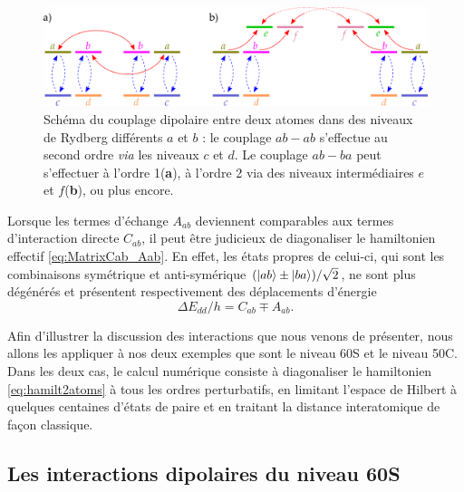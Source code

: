 \begin{figure}[!h]
\centering
\includegraphics[width=0.9\linewidth]{figures/theory/dipole_coupling_abab}
\caption[Couplage dipolaire entre niveaux de Rydberg différents]{Schéma du couplage dipolaire entre deux atomes dans des niveaux de Rydberg différents $a$ et $b$ : le couplage $ab-ab$ s'effectue au second ordre \textit{via} les niveaux $c$ et $d$. Le couplage $ab-ba$ peut s'effectuer à l'ordre 1(\textbf{a}), à l'ordre 2 via des niveaux intermédiaires $e$ et $f$(\textbf{b}), ou plus encore.}
\label{fig:Dip_abab}
\end{figure}


Lorsque les termes d'échange $A_{ab}$ deviennent comparables aux termes d'interaction directe $C_{ab}$, il peut être judicieux de diagonaliser le hamiltonien effectif \eqref{eq:MatrixCab_Aab}.
En effet, les états propres de celui-ci, qui sont les combinaisons symétrique et anti-symérique $(\ket{ab}\pm \ket{ba})/\sqrt{2}$, ne sont plus dégénérés et présentent respectivement des déplacements d'énergie
\begin{equation}
\label{eq:shift_abab}
\Delta E_{dd} /h = C_{ab} \mp A_{ab}.
\end{equation}

Afin d'illustrer la discussion des interactions que nous venons de présenter, nous allons les appliquer à nos deux exemples que sont le niveau 60S et le niveau 50C.
Dans les deux cas, le calcul numérique consiste à diagonaliser le hamiltonien \eqref{eq:hamilt2atoms} à tous les ordres perturbatifs, en limitant l'espace de Hilbert à quelques centaines d'états de paire et en traitant la distance interatomique de façon classique.

\subsection{Les interactions dipolaires du niveau 60S}\label{subsec:inter_60Snl}

